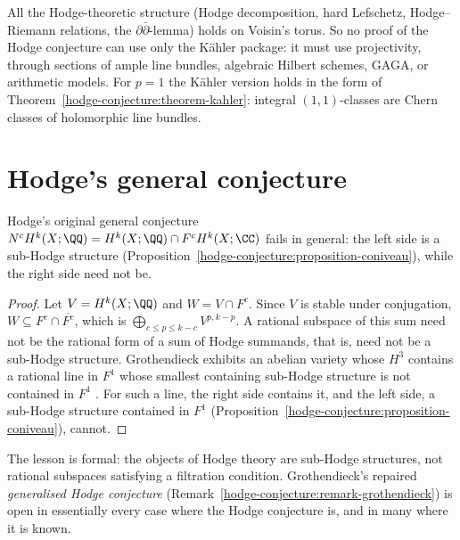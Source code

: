 \begin{remark}\label{known-cases:remark-kahler-lesson}
All the Hodge-theoretic structure (Hodge decomposition, hard Lefschetz, Hodge--Riemann relations, the $\partial\bar\partial$-lemma) holds on Voisin's torus. So no proof of the Hodge conjecture can use
only the K\"ahler package: it must use projectivity, through sections of ample line bundles, algebraic Hilbert schemes, GAGA, or arithmetic models. For $p = 1$ the K\"ahler version holds in the form
of Theorem~\ref{hodge-conjecture:theorem-kahler}: integral $(1,1)$-classes are Chern classes of holomorphic line bundles.
\end{remark}

\section{Hodge's general conjecture}\label{known-cases:section-general-failures}

\begin{proposition}\label{known-cases:proposition-general-false}
Hodge's original general conjecture $N^cH^k(X; \QQ) = H^k(X; \QQ) \cap F^cH^k(X; \CC)$ fails in general: the left side is a sub-Hodge structure
(Proposition~\ref{hodge-conjecture:proposition-coniveau}), while the right side need not be.
\end{proposition}

\begin{proof}
Let $V = H^k(X; \QQ)$ and $W = V \cap F^c$. Since $V$ is stable under conjugation, $W \subseteq F^c \cap \overline{F^c}$, which is $\bigoplus_{c \leq p \leq k-c}V^{p,k-p}$. A rational subspace of this sum need
not be the rational form of a sum of Hodge summands, that is, need not be a sub-Hodge structure. Grothendieck exhibits an abelian variety whose $H^3$ contains a rational line in $F^1$ whose smallest
containing sub-Hodge structure is not contained in $F^1$ \cite{grothendieck-1969}. For such a line, the right side contains it, and the left side, a sub-Hodge structure contained in $F^1$
(Proposition~\ref{hodge-conjecture:proposition-coniveau}), cannot.
\end{proof}

\begin{remark}\label{known-cases:remark-general-lesson}
The lesson is formal: the objects of Hodge theory are sub-Hodge structures, not rational subspaces satisfying a filtration condition. Grothendieck's repaired \emph{generalised Hodge conjecture}
(Remark~\ref{hodge-conjecture:remark-grothendieck}) is open in essentially every case where the Hodge conjecture is, and in many where it is known.
\end{remark}

